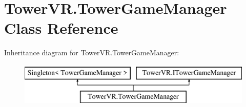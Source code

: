 \hypertarget{class_tower_v_r_1_1_tower_game_manager}{}\section{Tower\+V\+R.\+Tower\+Game\+Manager Class Reference}
\label{class_tower_v_r_1_1_tower_game_manager}
Inheritance diagram for Tower\+V\+R.\+Tower\+Game\+Manager\+:\begin{figure}[H]
\begin{center}
\leavevmode
\includegraphics[height=2.000000cm]{class_tower_v_r_1_1_tower_game_manager}
\end{center}
\end{figure}
